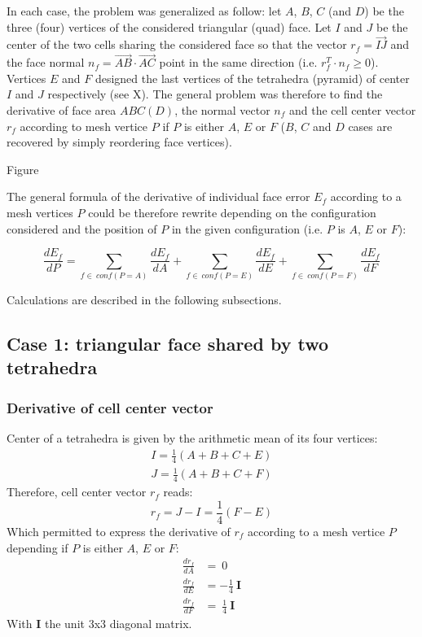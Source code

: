 \documentclass[11pt]{article}
\begin{document}
In each case, the problem was generalized as follow: let $A$, $B$, $C$ (and $D$) be the three (four) vertices of the considered triangular (quad) face. 
Let $I$ and $J$ be the center of the two cells sharing the considered face so that the vector $r_f = \overrightarrow{IJ}$ and the face normal $n_f = \overrightarrow{AB} \cdot \overrightarrow{AC}$ point in the same direction (i.e. $r_f^T \cdot n_f \geq 0$).
Vertices $E$ and $F$ designed the last vertices of the tetrahedra (pyramid) of center $I$ and $J$ respectively (see X).
The general problem was therefore to find the derivative of face area $ABC(D)$, the normal vector $n_f$ and the cell center vector $r_f$ according to mesh vertice $P$ if $P$ is either $A$, $E$ or $F$ ($B$, $C$ and $D$ cases are recovered by simply reordering face vertices). 

Figure

The general formula of the derivative of individual face error $E_f$ according to a mesh vertices $P$ could be therefore rewrite depending on the configuration considered and the position of $P$ in the given configuration (i.e. $P$ is $A$, $E$ or $F$):

\begin{equation}
\frac{dE_f}{dP} = \sum_{f\in\ conf(P=A)} \frac{dE_f}{dA} + \sum_{f\in\ conf(P=E)} \frac{dE_f}{dE} +
\sum_{f\in\ conf(P=F)} \frac{dE_f}{dF} 
\end{equation}

Calculations are described in the following subsections.


\subsection{Case 1: triangular face shared by two tetrahedra}

\subsubsection{Derivative of cell center vector}

Center of a tetrahedra is given by the arithmetic mean of its four vertices:
\begin{subequations}
\begin{gather}
I = \frac{1}{4} (A + B + C + E) \\
J = \frac{1}{4} (A + B + C + F)
\end{gather}
\end{subequations} 
Therefore, cell center vector $r_f$ reads:
\begin{equation}
r_f = J-I = \frac{1}{4} (F - E)
\end{equation}
Which permitted to express the derivative of $r_f$ according to a mesh vertice $P$ depending if $P$ is either $A$, $E$ or $F$:
\begin{subequations}
\begin{align}
\frac{d r_f}{d A} &= \ 0 \\
\frac{d r_f}{d E} &= - \frac{1}{4}\ \boldsymbol{I} \\
\frac{d r_f}{d F} &= \ \frac{1}{4}\ \boldsymbol{I} 
\end{align}
\end{subequations} 
With $\boldsymbol{I}$ the unit 3x3 diagonal matrix.
\end{document}
